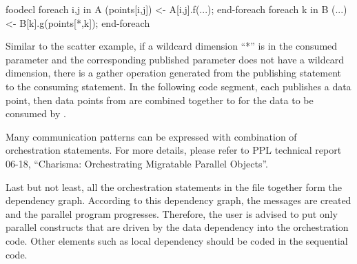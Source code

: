 \begin{SaveVerbatim}{foodecl}
  foreach i,j in A
    (points[i,j]) <- A[i,j].f(...);
  end-foreach
  foreach k in B
    (...) <- B[k].g(points[*,k]);
  end-foreach
\end{SaveVerbatim}
\vspace{0.1in}
\vspace{0.1in}

Similar to the scatter example, if a wildcard dimension ``*'' is in the
consumed parameter and the corresponding published parameter does not have a
wildcard dimension, there is a gather operation generated from the publishing
statement to the consuming statement. In the following code segment, each 
 publishes a data point, then data points from  are
combined together to for the data to be consumed by .  

Many communication patterns can be expressed with combination of orchestration
statements. For more details, please refer to PPL technical report 06-18,
``Charisma: Orchestrating Migratable Parallel Objects''.

Last but not least, all the orchestration statements in the  file
together form the dependency graph. According to this dependency graph, the
messages are created and the parallel program progresses. Therefore, the user is
advised to put only parallel constructs that are driven by the data dependency
into the orchestration code. Other elements such as local dependency should be
coded in the sequential code. 

